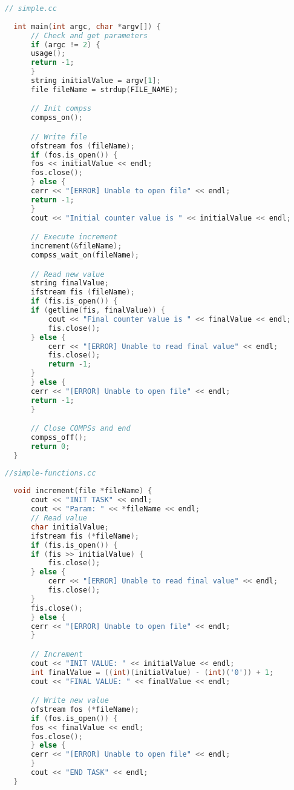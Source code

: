 \begin{lstlisting}[language=c]
  // simple.cc
	
  int main(int argc, char *argv[]) {
      // Check and get parameters
      if (argc != 2) {
	  usage();
	  return -1;
      }
      string initialValue = argv[1];
      file fileName = strdup(FILE_NAME);

      // Init compss
      compss_on();

      // Write file
      ofstream fos (fileName);
      if (fos.is_open()) {
	  fos << initialValue << endl;
	  fos.close();
      } else {
	  cerr << "[ERROR] Unable to open file" << endl;
	  return -1;
      }
      cout << "Initial counter value is " << initialValue << endl;

      // Execute increment
      increment(&fileName);
      compss_wait_on(fileName);

      // Read new value
      string finalValue;
      ifstream fis (fileName);
      if (fis.is_open()) {
	  if (getline(fis, finalValue)) {
	      cout << "Final counter value is " << finalValue << endl;
	      fis.close();
	  } else {
	      cerr << "[ERROR] Unable to read final value" << endl;
	      fis.close();
	      return -1;
	  }
      } else {
	  cerr << "[ERROR] Unable to open file" << endl;
	  return -1;
      }

      // Close COMPSs and end
      compss_off();
      return 0;
  }
\end{lstlisting}

\begin{lstlisting}[language=c]
  //simple-functions.cc
  
  void increment(file *fileName) {
      cout << "INIT TASK" << endl;
      cout << "Param: " << *fileName << endl;
      // Read value
      char initialValue;
      ifstream fis (*fileName);
      if (fis.is_open()) {
	  if (fis >> initialValue) {
	      fis.close();
	  } else {
	      cerr << "[ERROR] Unable to read final value" << endl;
	      fis.close();
	  }
	  fis.close();
      } else {
	  cerr << "[ERROR] Unable to open file" << endl;
      }

      // Increment
      cout << "INIT VALUE: " << initialValue << endl;
      int finalValue = ((int)(initialValue) - (int)('0')) + 1;
      cout << "FINAL VALUE: " << finalValue << endl;

      // Write new value
      ofstream fos (*fileName);
      if (fos.is_open()) {
	  fos << finalValue << endl;
	  fos.close();
      } else {
	  cerr << "[ERROR] Unable to open file" << endl;
      }
      cout << "END TASK" << endl;
  }
\end{lstlisting}

